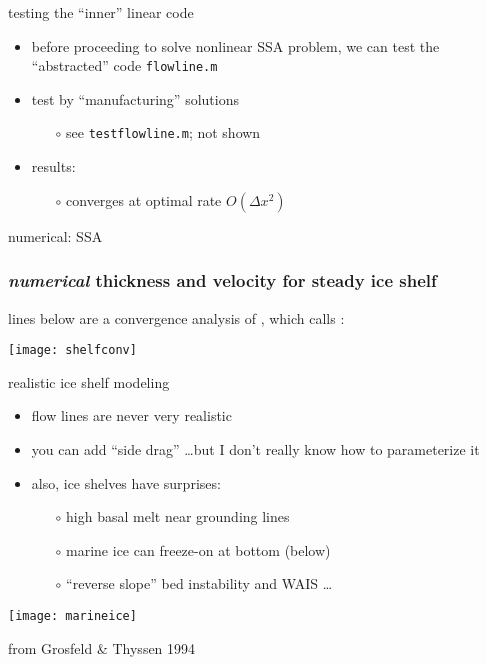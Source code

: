 \begin{frame}{testing the ``inner'' linear code}

\begin{itemize}
\item before proceeding to solve nonlinear SSA problem, we can test the ``abstracted'' code \texttt{flowline.m}
\item test by ``manufacturing'' solutions
  \begin{itemize}
  \item[$\circ$] see \texttt{testflowline.m}; not shown
  \end{itemize}
\item results:
  \begin{itemize}
  \item[$\circ$] converges at optimal rate $O(\Delta x^2)$
  \end{itemize}
\end{itemize}
\end{frame}


\begin{frame}{numerical: SSA}

\end{frame}


\begin{frame}[fragile]
  \frametitle{\emph{numerical} thickness and velocity for steady ice shelf}

lines below are a convergence analysis of , which calls :

\begin{center}
  \texttt{[image: shelfconv]}
\end{center}
\end{frame}


\begin{frame}{realistic ice shelf modeling}

\begin{itemize}
\item flow lines are never very realistic
\item you can add ``side drag'' \dots but I don't really know how to parameterize it
\item also, ice shelves have surprises:
  \begin{itemize}
  \item[$\circ$] high basal melt near grounding lines
  \item[$\circ$] marine ice can freeze-on at bottom (below)
  \item[$\circ$] ``reverse slope'' bed instability and WAIS \dots
  \end{itemize}
\end{itemize}

\medskip
\begin{center}
  \texttt{[image: marineice]}
  
  \medskip
  \tiny from Grosfeld \& Thyssen 1994
\end{center}
\end{frame}


